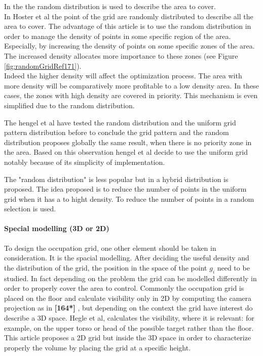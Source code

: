  In the  \cite{83*van2009,171*horster2006} the random distribution is used to describe the area to cover. \\
In Hoster et al \citep{171*horster2006} the point of the grid are randomly distributed to describe all the area to cover. The advantage of this article is to use the random distribution in order to manage the density of points in some specific region of the area. Especially, by increasing the density of points on some specific zones of the area. The increased density allocates more importance to these zones (see Figure \ref{fig:randomGridRef171}).\\
Indeed the higher density will affect the optimization process. The area with more density will be comparatively more profitable to a low density area. In these cases, the zones with high density are covered in priority. This mechanism is even simplified due to the random distribution.

The hengel et al \cite{83*van2009} have tested the random distribution and the uniform grid pattern distribution before to conclude the grid pattern and the random distribution proposes globally the same result, when there is no priority zone in the area. Based on this observation hengel et al \cite{83*van2009} decide to use the uniform grid notably because of its simplicity of implementation.

The "random distribution" is less popular but in \cite{22*zhao2008} a hybrid distribution is proposed. The idea proposed is to reduce the number of points in the uniform grid when it has a to hight density. To reduce the number of points in a random  selection is used. 



\paragraph*{ Special modelling (3D  or 2D)}
To design the occupation grid, one other element should be taken in consideration. It is the spacial modelling. After deciding the useful density and the distribution of the grid, the position in the space of the point $g_i$ need to be studied.  
In fact depending on the problem the grid can be modelled differently in order to properly cover the area to control. Commonly the occupation grid is placed on the floor and calculate visibility only in 2D  by computing the  camera projection as in \textbf{[164*]} \citep{164*valente2013,150*chakrabarty2002,8*zhou2011,170*yabuta2008,171*horster2006,22*zhao2008}, but depending on the context the grid have interest do describe a 3D space.  
Hegle et al\cite{83*van2009}, calculates the visibility, where it is relevant: for example, on the upper torso or head of the possible target rather than the floor. This article  proposes a 2D grid but inside the 3D space in order to  characterize properly the volume by placing the grid at a specific height.  

